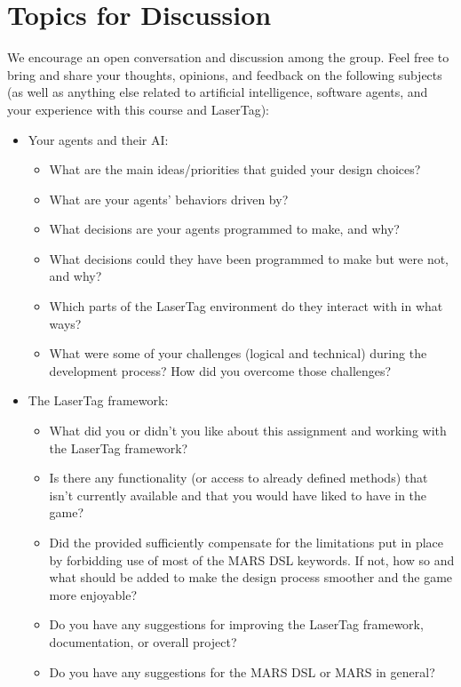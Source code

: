 \documentclass[
    a4paper,
    english,
    DIV=16,
    11pt,
    parskip=half,
]{scrartcl}
\begin{document}
\section*{Topics for Discussion}
We encourage an open conversation and discussion among the group. Feel free to bring and share your thoughts, opinions, and feedback on the following subjects (as well as anything else related to artificial intelligence, software agents, and your experience with this course and LaserTag):
\begin{itemize}
    \item Your agents and their AI:
    \begin{itemize}
        \item What are the main ideas/priorities that guided your design choices?
        \item What are your agents' behaviors driven by?
        \item What decisions are your agents programmed to make, and why? \item What decisions could they have been programmed to make but were not, and why?
        \item Which parts of the LaserTag environment do they interact with in what ways?
        \item What were some of your challenges (logical and technical) during the development process? How did you overcome those challenges?
    \end{itemize}
    \item The LaserTag framework:
    \begin{itemize}
        \item What did you or didn't you like about this assignment and working with the LaserTag framework?
        \item Is there any functionality (or access to already defined methods) that isn't currently available and that you would have liked to have in the game?
        \item Did the provided  sufficiently compensate for the limitations put in place by forbidding use of most of the MARS DSL keywords. If not, how so and what should be added to make the design process smoother and the game more enjoyable?
        \item Do you have any suggestions for improving the LaserTag framework, documentation, or overall project?
        \item Do you have any suggestions for the MARS DSL or MARS in general?
    \end{itemize}
\end{itemize}
\end{document}
